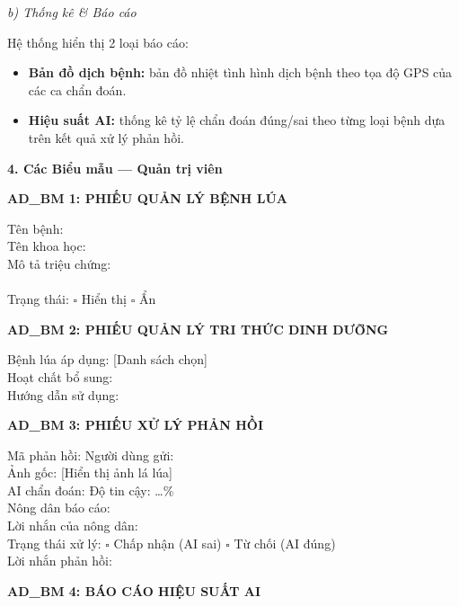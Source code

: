 \documentclass[12pt,a4paper]{article}
\begin{document}
\noindent\textit{b) Thống kê \& Báo cáo}

Hệ thống hiển thị 2 loại báo cáo:
\begin{itemize}
    \item \textbf{Bản đồ dịch bệnh:} bản đồ nhiệt tình hình dịch bệnh theo tọa độ GPS của các ca chẩn đoán.
    \item \textbf{Hiệu suất AI:} thống kê tỷ lệ chẩn đoán đúng/sai theo từng loại bệnh dựa trên kết quả xử lý phản hồi.
\end{itemize}

\vspace{0.3cm}
\textbf{4. Các Biểu mẫu --- Quản trị viên}

\vspace{0.3cm}
\noindent\textbf{AD\_BM 1: PHIẾU QUẢN LÝ BỆNH LÚA}

\noindent Tên bệnh: \dotfill \\
Tên khoa học: \dotfill \\
Mô tả triệu chứng: \dotfill \\
\dotfill \\
Trạng thái: $\square$ Hiển thị \quad $\square$ Ẩn

\vspace{0.3cm}
\noindent\textbf{AD\_BM 2: PHIẾU QUẢN LÝ TRI THỨC DINH DƯỠNG}

\noindent Bệnh lúa áp dụng: [Danh sách chọn] \dotfill \\
Hoạt chất bổ sung: \dotfill \\
Hướng dẫn sử dụng: \dotfill \\
\dotfill

\vspace{0.3cm}
\noindent\textbf{AD\_BM 3: PHIẾU XỬ LÝ PHẢN HỒI}

\noindent Mã phản hồi: \dotfill \quad Người dùng gửi: \dotfill \\
Ảnh gốc: [Hiển thị ảnh lá lúa] \\
AI chẩn đoán: \dotfill \quad Độ tin cậy: \dots\% \\
Nông dân báo cáo: \dotfill \\
Lời nhắn của nông dân: \dotfill \\
Trạng thái xử lý: $\square$ Chấp nhận (AI sai) \quad $\square$ Từ chối (AI đúng) \\
Lời nhắn phản hồi: \dotfill \\
\dotfill

\vspace{0.3cm}
\noindent\textbf{AD\_BM 4: BÁO CÁO HIỆU SUẤT AI}
\end{document}
